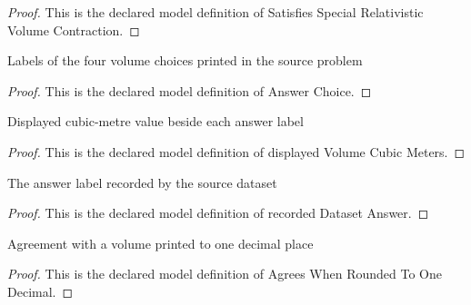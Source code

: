 \begin{proof}
  This is the declared model definition of Satisfies Special Relativistic Volume Contraction.
\end{proof}
\begin{definition}
  \label{def:physics:phyx-mini-0559:phyxminiproblems-problemphyxmini0559-answerchoice}
  Labels of the four volume choices printed in the source problem
\end{definition}
\begin{proof}
  This is the declared model definition of Answer Choice.
\end{proof}
\begin{definition}
  \label{def:physics:phyx-mini-0559:phyxminiproblems-problemphyxmini0559-displayedvolumecubicmeters}
  Displayed cubic-metre value beside each answer label
\end{definition}
\begin{proof}
  This is the declared model definition of displayed Volume Cubic Meters.
\end{proof}
\begin{definition}
  \label{def:physics:phyx-mini-0559:phyxminiproblems-problemphyxmini0559-recordeddatasetanswer}
  The answer label recorded by the source dataset
\end{definition}
\begin{proof}
  This is the declared model definition of recorded Dataset Answer.
\end{proof}
\begin{definition}
  \label{def:physics:phyx-mini-0559:phyxminiproblems-problemphyxmini0559-agreeswhenroundedtoonedecimal}
  Agreement with a volume printed to one decimal place
\end{definition}
\begin{proof}
  This is the declared model definition of Agrees When Rounded To One Decimal.
\end{proof}
